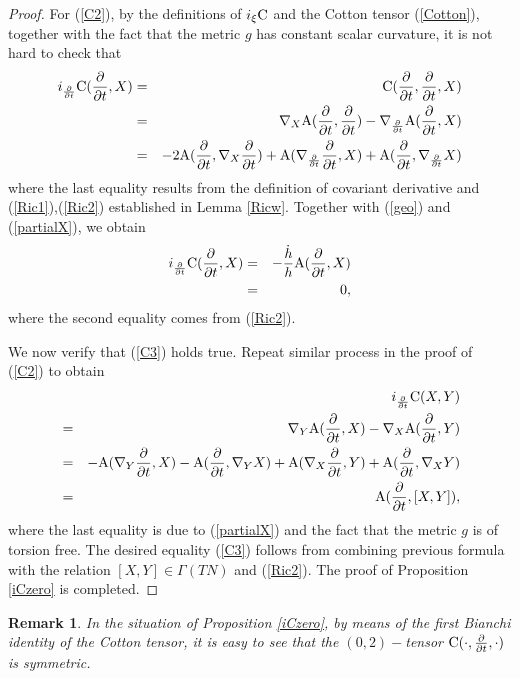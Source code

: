 \documentclass[10pt,leqno,oneside]{amsart}
\newtheorem{Rmk}{Remark}
\begin{document}
{\begin{proof}
          For (\ref{C2}), by the definitions of $i_{\xi}{\rm{C}}$ and the Cotton tensor (\ref{Cotton}), together with the fact that the metric $g$ has constant scalar curvature, it is not hard to check that
          \begin{eqnarray*}
          i_{\frac{\partial}{\partial t}}{\rm{C}}(\frac{\partial}{\partial t},X)&=& {\rm{C}}(\frac{\partial}{\partial t},\frac{\partial}{\partial t},X) \\
             &=&\nabla_X{\rm{A}}(\frac{\partial}{\partial t},\frac{\partial}{\partial t})-\nabla_{\frac{\partial}{\partial t}}{\rm{A}}(\frac{\partial}{\partial t},X)\\
             &=&-2{\rm{A}}(\frac{\partial}{\partial t},\nabla_X{\frac{\partial}{\partial t}})+{\rm{A}}(\nabla_{\frac{\partial}{\partial t}}\frac{\partial}{\partial t},X)+{\rm{A}}(\frac{\partial}{\partial t},\nabla_{\frac{\partial}{\partial t}}X)
          \end{eqnarray*}
          where the last equality results from the definition of covariant derivative and (\ref{Ric1}),(\ref{Ric2}) established in Lemma \ref{Ricw}. Together with (\ref{geo}) and (\ref{partialX}), we obtain
          \begin{eqnarray*}
          i_{\frac{\partial}{\partial t}}{\rm{C}}(\frac{\partial}{\partial t},X)&=&-\frac{\dot{h}}{h}{\rm{A}}(\frac{\partial}{\partial t},X)\\
          &=&0,
          \end{eqnarray*}
          where the second equality comes from (\ref{Ric2}).

          We now verify that (\ref{C3}) holds true. Repeat similar process in the proof of (\ref{C2}) to obtain
          \begin{eqnarray*}
          &&i_{\frac{\partial}{\partial t}}{\rm{C}}(X,Y)\\
             &=&\nabla_{Y}{\rm{A}}(\frac{\partial}{\partial t},X)-\nabla_X{\rm{A}}(\frac{\partial}{\partial t},Y)\\
             &=&-{\rm{A}}(\nabla_{Y}\frac{\partial}{\partial t},X)-{\rm{A}}(\frac{\partial}{\partial t},\nabla_{Y}X)+{\rm{A}}(\nabla_{X}\frac{\partial}{\partial t},Y)+{\rm{A}}(\frac{\partial}{\partial t},\nabla_{X}Y)\\
             &=&{\rm{A}}(\frac{\partial}{\partial t},[X,Y]),
          \end{eqnarray*}
          where the last equality is due to (\ref{partialX}) and the fact that the metric $g$ is of torsion free. The desired equality (\ref{C3}) follows from combining previous formula with the relation $[X,Y]\in\Gamma(TN )$ and (\ref{Ric2}). The proof of Proposition \ref{iCzero} is completed.
    \end{proof}
    \begin{Rmk}\label{symC}
          In the situation of Proposition {\rm\ref{iCzero}}, by means of the first Bianchi identity of the Cotton tensor, it is easy to see that the $(0,2)-$tensor ${\rm{C}}(\cdot,\frac{\partial}{\partial t},\cdot)$ is symmetric.
    \end{Rmk}

}
\end{document}
